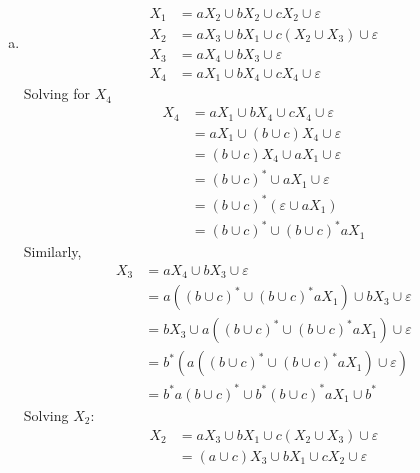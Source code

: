 \begin{solution}
    \begin{enumerate}[(a)]
        \item 
        
        \begin{align*}
            X_1 &= aX_2\cup bX_2\cup cX_2\cup\varepsilon\\
            X_2 &= aX_3\cup bX_1 \cup c(X_2\cup X_3)\cup\varepsilon\\
            X_3 &= aX_4\cup bX_3\cup\varepsilon\\
            X_4 &= aX_1\cup bX_4\cup cX_4\cup\varepsilon  
        \end{align*}
        Solving for $X_4$ 
        \begin{align*}
            X_4 &= aX_1\cup bX_4\cup cX_4\cup\varepsilon\\
                &= aX_1\cup (b\cup c)X_4\cup\varepsilon\\
                &= (b\cup c)X_4\cup aX_1\cup\varepsilon\\
                &= (b\cup c)^*\cup aX_1\cup\varepsilon\\
                &= (b\cup c)^*(\varepsilon\cup aX_1)\\
                &= (b\cup c)^*\cup (b\cup c)^*aX_1
        \end{align*}
    Similarly, 
        \begin{align*}
            X_3 &= aX_4\cup bX_3\cup\varepsilon\\
                &= a\left((b\cup c)^*\cup (b\cup c)^*aX_1\right)\cup bX_3\cup\varepsilon\\
                &= bX_3\cup a\left((b\cup c)^*\cup (b\cup c)^*aX_1\right)\cup\varepsilon\\
                &= b^*(a\left((b\cup c)^*\cup (b\cup c)^*aX_1\right)\cup\varepsilon)\\
                &= b^*a(b\cup c)^*\cup b^*(b\cup c)^*aX_1\cup b^*
        \end{align*}
    Solving $X_2$:
    \begin{align*}
        X_2 &= aX_3\cup bX_1 \cup c(X_2\cup X_3)\cup\varepsilon\\
            &= (a\cup c)X_3 \cup bX_1 \cup cX_2\cup\varepsilon
    \end{align*}


\end{enumerate}
\end{solution}
